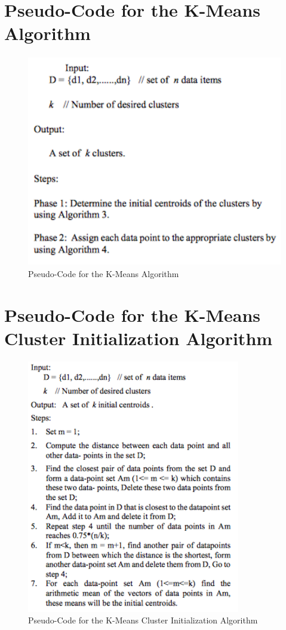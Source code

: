 \documentclass[12pt]{article}
\begin{document}
\newpage
\section{Pseudo-Code for the K-Means Algorithm}
\label{appendix:kmeans}
\begin{figure}[!htb]
\begin{center}
	\includegraphics[height=25em]{kmeans.png}
	\caption{Pseudo-Code for the K-Means Algorithm}
\end{center}
\end{figure}

\newpage
\section{Pseudo-Code for the K-Means Cluster Initialization Algorithm}
\label{appendix:kmeansinit}
\begin{figure}[!htb]
\begin{center}
	\includegraphics[height=30em]{kmeans_init.png}
	\caption{Pseudo-Code for the K-Means Cluster Initialization Algorithm}
\end{center}
\end{figure}
\end{document}
